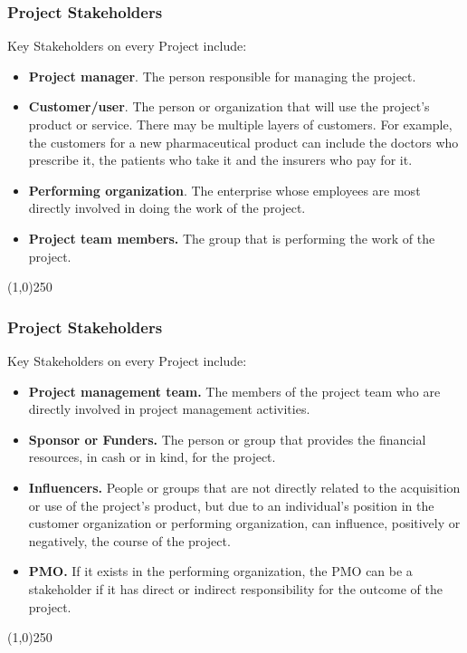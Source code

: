 \begin{frame}
\frametitle{Project Stakeholders}
Key Stakeholders on every Project include:\\
\begin{itemize}
	\item \textbf{Project manager}. The person responsible for managing the project. 
	\item \textbf{Customer/user}. The person or organization that will use the project's product or service. There may be multiple layers of customers. For example, the customers for a new pharmaceutical product can include the doctors who prescribe it, the patients who take it and the insurers who pay for it.
	\item \textbf{Performing organization}. The enterprise whose employees are most directly involved in doing the work of the project. 
	\item \textbf{Project team members.} The group that is performing the work of the project. 
\end{itemize}
\end{frame}
\begin{center}\line(1,0){250}\end{center}


\begin{frame}
\frametitle{Project Stakeholders}
Key Stakeholders on every Project include:\\
\begin{itemize}
	\item \textbf{Project management team.} The members of the project team who are directly involved in project management activities. 
	\item \textbf{Sponsor or Funders.} The person or group that provides the financial resources, in cash or in kind, for the project. 
	\item \textbf{Influencers.} People or groups that are not directly related to the acquisition or use of the project's product, but due to an individual's position in the customer organization or performing organization, can influence, positively or negatively, the course of the project. 
	\item \textbf{PMO.} If it exists in the performing organization, the PMO can be a stakeholder if it has direct or indirect responsibility for the outcome of the project. 
\end{itemize}
\end{frame}
\begin{center}\line(1,0){250}\end{center}





